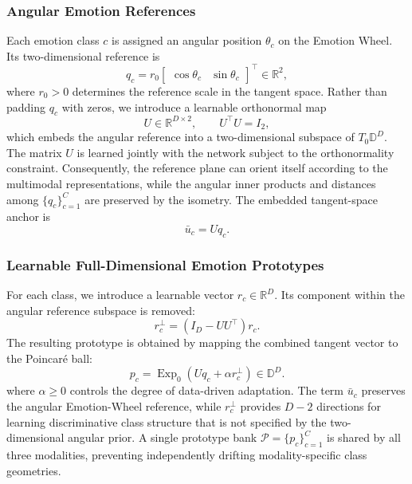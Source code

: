 \documentclass[letterpaper,journal]{IEEEtran}
\begin{document}
\subsubsection{Angular Emotion References}

Each emotion class \(c\) is assigned an angular position \(\theta_c\) on the
Emotion Wheel. Its two-dimensional reference is
\begin{equation}
    q_c=r_0
    \begin{bmatrix}
        \cos\theta_c & \sin\theta_c
    \end{bmatrix}^{\top}
    \in\mathbb{R}^{2},
    \label{eq:rgrpl_angular_reference}
\end{equation}
where \(r_0>0\) determines the reference scale in the tangent space. Rather
than padding \(q_c\) with zeros, we introduce a learnable orthonormal map
\begin{equation}
    U\in\mathbb{R}^{D\times 2},
    \qquad U^\top U=I_2,
    \label{eq:rgrpl_psychological_subspace}
\end{equation}
which embeds the angular reference into a two-dimensional subspace of
\(T_0\mathbb{D}^{D}\). The matrix \(U\) is learned jointly with the network
subject to the orthonormality constraint. Consequently, the reference plane
can orient itself according to the multimodal representations, while the
angular inner products and distances among \(\{q_c\}_{c=1}^{C}\) are
preserved by the isometry. The embedded tangent-space anchor is
\begin{equation}
    \bar u_c=Uq_c.
    \label{eq:rgrpl_tangent_anchor}
\end{equation}

\subsubsection{Learnable Full-Dimensional Emotion Prototypes}

For each class, we introduce a learnable vector
\(r_c\in\mathbb{R}^{D}\). Its component within the angular reference subspace
is removed:
\begin{equation}
    r_c^\perp=(I_D-UU^\top)r_c.
    \label{eq:rgrpl_orthogonal_residual}
\end{equation}
The resulting prototype is obtained by mapping the combined tangent vector to
the Poincar\'e ball:
\begin{equation}
    \boxed{
    p_c=\operatorname{Exp}_0\!\left(Uq_c+\alpha r_c^\perp\right)}
    \in\mathbb{D}^{D}.
    \label{eq:rgrpl_learned_prototype}
\end{equation}
where \(\alpha\geq 0\) controls the degree of data-driven adaptation. The
term \(\bar u_c\) preserves the angular Emotion-Wheel reference, while
\(r_c^\perp\) provides \(D-2\) directions for learning discriminative class
structure that is not specified by the two-dimensional angular prior. A single
prototype bank \(\mathcal{P}=\{p_c\}_{c=1}^{C}\) is shared by all three
modalities, preventing independently drifting modality-specific class
geometries.
\end{document}
